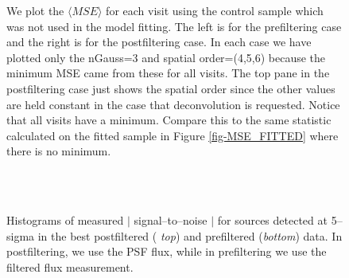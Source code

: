 \documentclass[prd, nofootinbib, floatfix, 11pt,tightenlines,times]{article}
\begin{document}
\begin{figure}%
\centering
{}
\caption{We plot the $\langle MSE \rangle$ for each visit using the control sample which was not used in the
model fitting.  The left is for the prefiltering case and the right is for the 
postfiltering case.  In each case we have plotted only the nGauss=3 and spatial order=(4,5,6) because the minimum MSE came
from these for all visits.  The top pane in the postfiltering case just shows the spatial order since the other 
values are held constant in the case that deconvolution is requested.  Notice that all visits have a minimum.
Compare this to the same statistic calculated on the fitted sample in Figure \ref{fig-MSE_FITTED} where there is no minimum.}
\label{fig-MSE_CONTROL}
\end{figure}


\begin{figure}
\begin{center}
 \\
 \\
\end{center}
\caption{Histograms of measured $|$ signal--to--noise $|$
  for sources detected at 5--sigma in the best postfiltered ({\it
    top}) and prefiltered ({\it bottom}) data.  In postfiltering, we
  use the PSF flux, while in prefiltering we use the filtered flux
  measurement.  }
\label{fluxerr}
\end{figure}
\end{document}
